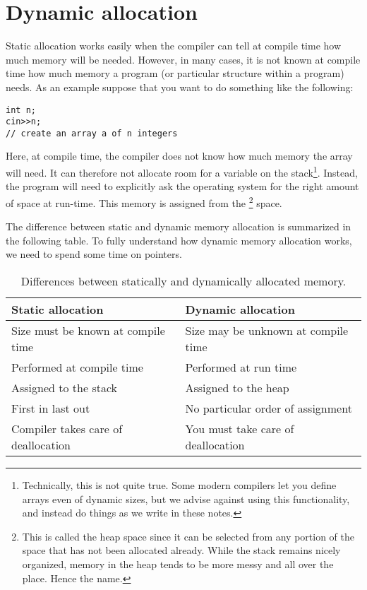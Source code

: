 \section{Dynamic allocation}
Static allocation works easily when the compiler can tell at compile
time how much memory will be needed.
However, in many cases, it is not known at compile time how much
memory a program (or particular structure within a program) needs.
As an example suppose that you want to do something like the following:

\begin{verbatim}
int n;
cin>>n;
// create an array a of n integers
\end{verbatim}

Here, at compile time, the compiler does not know how much memory the
array will need. It can therefore not allocate room for a variable on
the stack\footnote{Technically, this is not quite true. Some modern
  compilers let you define arrays even of dynamic sizes, but we advise
  against using this functionality, and instead do things as we write
  in these notes.}.
Instead, the program will need to explicitly ask the operating system
for the right amount of space at run-time. 
This memory is assigned from the \footnote{This is called
  the heap space since it can be selected from any portion of the
  space that has not been allocated already. While the stack remains
  nicely organized, memory in the heap tends to be more messy and all
  over the place. Hence the name.} space. 

The difference between static and dynamic memory allocation is
summarized in the following table.
To fully understand how dynamic memory allocation works,
we need to spend some time on pointers.

\begin{table}[h]
	\centering
    \begin{tabular}{l|l}
       \textbf{Static allocation}         & \textbf{Dynamic allocation}                \\ \hline
        Size must be known at compile time & Size may be unknown at compile time \\
        Performed at compile time & Performed at run time             \\ 
        Assigned to the stack     & Assigned to the heap              \\ 
        First in last out         & No particular order of assignment \\
        Compiler takes care of deallocation & You must take care of
                                              deallocation \\
    \end{tabular}
\caption{Differences between statically and dynamically allocated memory.}
\end{table}

